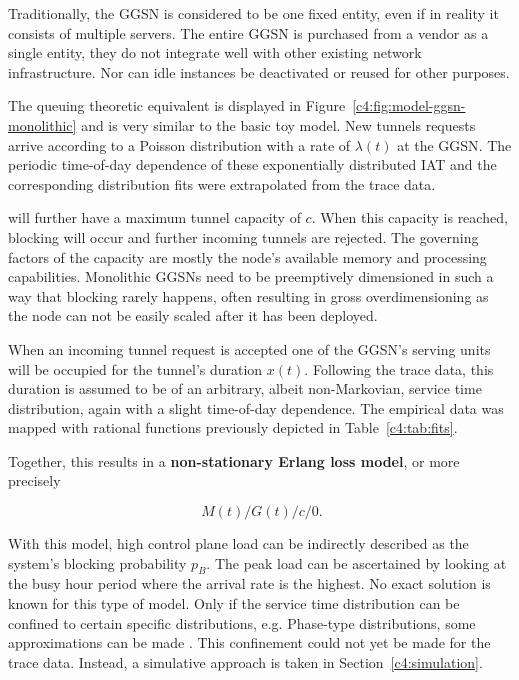 Traditionally, the \gls{GGSN} is considered to be one fixed entity, even if in reality it consists of multiple servers. The entire \gls{GGSN} is purchased from a vendor as a single entity, they do not integrate well with other existing network infrastructure. Nor can idle instances be deactivated or reused for other purposes.

The queuing theoretic equivalent is displayed in Figure~\ref{c4:fig:model-ggsn-monolithic} and is very similar to the basic toy model.
New tunnels requests arrive according to a Poisson distribution with a rate of $\lambda(t)$ at the \gls{GGSN}. The periodic time-of-day dependence of these exponentially distributed \gls{IAT} and the corresponding distribution fits were extrapolated from the trace data.

 will further have a maximum tunnel capacity of $c$. When this capacity is reached, blocking will occur and further incoming tunnels are rejected. The governing factors of the capacity are mostly the node's available memory and processing capabilities. Monolithic \glspl{GGSN} need to be preemptively dimensioned in such a way that blocking rarely happens, often resulting in gross overdimensioning as the node can not be easily scaled after it has been deployed.

When an incoming tunnel request is accepted one of the \gls{GGSN}'s serving units will be occupied for the tunnel's duration $x(t)$. Following the trace data, this duration is assumed to be of an arbitrary, albeit non-Markovian, service time distribution, again with a slight time-of-day dependence.
The empirical data was mapped with rational functions previously depicted in Table~\ref{c4:tab:fits}.

Together, this results in a \textbf{non-stationary Erlang loss model}, or more precisely

\begin{equation}
\phantom{.}M(t)/G(t)/c/0\text{.}
\end{equation}

With this model, high control plane load can be indirectly described as the system's blocking probability $p_B$. The peak load can be ascertained by looking at the busy hour period where the arrival rate is the highest. No exact solution is known for this type of model. Only if the service time distribution can be confined to certain specific distributions, e.g. Phase-type distributions, some approximations can be made \cite{davis1995nonstationaryerlang}. This confinement could not yet be made for the trace data. Instead, a simulative approach is taken in Section~\ref{c4:simulation}.


